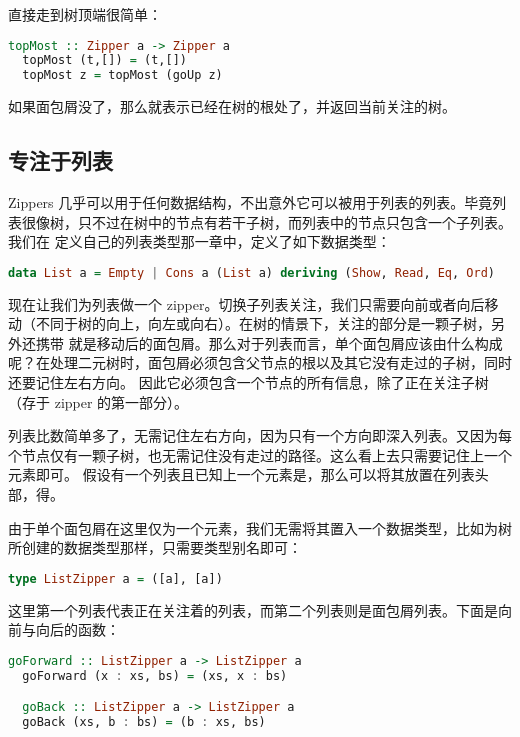 \documentclass[./main.tex]{subfiles}
\begin{document}
直接走到树顶端很简单：

\begin{lstlisting}[language=Haskell]
  topMost :: Zipper a -> Zipper a
  topMost (t,[]) = (t,[])
  topMost z = topMost (goUp z)
\end{lstlisting}

如果面包屑没了，那么就表示已经在树的根处了，并返回当前关注的树。

\subsection*{专注于列表}

Zippers 几乎可以用于任何数据结构，不出意外它可以被用于列表的列表。毕竟列表很像树，只不过在树中的节点有若干子树，而列表中的节点只包含一个子列表。我们在
定义自己的列表类型那一章中，定义了如下数据类型：

\begin{lstlisting}[language=Haskell]
  data List a = Empty | Cons a (List a) deriving (Show, Read, Eq, Ord)
\end{lstlisting}

现在让我们为列表做一个 zipper。切换子列表关注，我们只需要向前或者向后移动（不同于树的向上，向左或向右）。在树的情景下，关注的部分是一颗子树，另外还携带
就是移动后的面包屑。那么对于列表而言，单个面包屑应该由什么构成呢？在处理二元树时，面包屑必须包含父节点的根以及其它没有走过的子树，同时还要记住左右方向。
因此它必须包含一个节点的所有信息，除了正在关注子树（存于 zipper 的第一部分）。

列表比数简单多了，无需记住左右方向，因为只有一个方向即深入列表。又因为每个节点仅有一颗子树，也无需记住没有走过的路径。这么看上去只需要记住上一个元素即可。
假设有一个列表\acode{[3,4,5]}且已知上一个元素是，那么可以将其放置在列表头部，得\acode{[2,3,4,5]}。

由于单个面包屑在这里仅为一个元素，我们无需将其置入一个数据类型，比如为树所创建的数据类型那样，只需要类型别名即可：

\begin{lstlisting}[language=Haskell]
  type ListZipper a = ([a], [a])
\end{lstlisting}

这里第一个列表代表正在关注着的列表，而第二个列表则是面包屑列表。下面是向前与向后的函数：

\begin{lstlisting}[language=Haskell]
  goForward :: ListZipper a -> ListZipper a
  goForward (x : xs, bs) = (xs, x : bs)

  goBack :: ListZipper a -> ListZipper a
  goBack (xs, b : bs) = (b : xs, bs)
\end{lstlisting}
\end{document}
